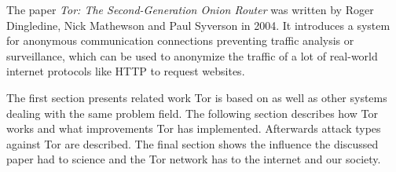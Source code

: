 
The paper \textit{Tor: The Second-Generation Onion Router} \cite{tor2004original} was written by Roger Dingledine, Nick Mathewson and Paul Syverson in 2004. 
It introduces a system for anonymous communication connections preventing traffic analysis or surveillance, which can be used to anonymize the traffic of a lot of real-world internet protocols like HTTP to request websites.



The first section presents related work Tor is based on as well as other systems dealing with the same problem field. The following section describes how Tor works and what improvements Tor has implemented.
Afterwards attack types against Tor are described. 
The final section shows the influence the discussed paper had to science and the Tor network has to the internet and our society.